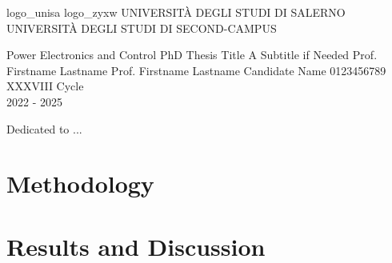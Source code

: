 \documentclass{pv_phd}
\begin{document}
\setuniversities
  {logo_unisa}  
  {logo_zyxw}          
  {UNIVERSITÀ DEGLI STUDI DI SALERNO}
  {UNIVERSITÀ DEGLI STUDI DI SECOND-CAMPUS} 

\makefrontpage
  {Power Electronics and Control}      %
  {PhD Thesis Title}                   %
  {A Subtitle if Needed}               %
  {Prof. Firstname Lastname}           %
  {Prof. Firstname Lastname}           %
  {Candidate Name}                     %
  {0123456789}                         %
  {XXXVIII Cycle \\ 2022 - 2025}       %
  
\begin{dedication}

    Dedicated to ...

\end{dedication}

    \tableofcontents \clearpage \sloppy {} 







\chapter{Methodology}
\blindtext[5] %

\chapter{Results and Discussion}
\blindtext[7] %
\end{document}
